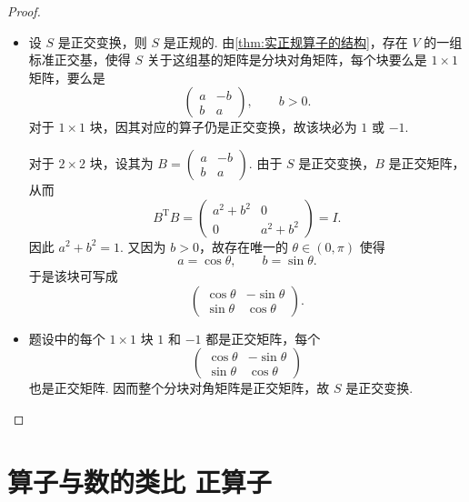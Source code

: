 \begin{proof}
    \begin{itemize}
        \item[(1) $ \Rightarrow $ (2)] 设 $ S $ 是正交变换，则 $ S $ 是正规的. 由\autoref{thm:实正规算子的结构}，存在 $ V $ 的一组标准正交基，使得 $ S $ 关于这组基的矩阵是分块对角矩阵，每个块要么是 $ 1 \times 1 $ 矩阵，要么是
        \[
            \begin{pmatrix}
                a & -b \\
                b & a
            \end{pmatrix},
            \qquad b > 0.
        \]
        对于 $ 1 \times 1 $ 块，因其对应的算子仍是正交变换，故该块必为 $ 1 $ 或 $ -1 $.

        对于 $ 2 \times 2 $ 块，设其为 $ B = \begin{pmatrix} a & -b \\ b & a \end{pmatrix} $. 由于 $ S $ 是正交变换，$ B $ 是正交矩阵，从而
        \[
            B^{\mathrm{T}} B = \begin{pmatrix}
                a^2 + b^2 & 0 \\
                0         & a^2 + b^2
            \end{pmatrix} = I.
        \]
        因此 $ a^2 + b^2 = 1 $. 又因为 $ b > 0 $，故存在唯一的 $ \theta \in (0, \pi) $ 使得
        \[
            a = \cos \theta, \qquad b = \sin \theta.
        \]
        于是该块可写成
        \[
            \begin{pmatrix}
                \cos \theta & -\sin \theta \\
                \sin \theta & \cos \theta
            \end{pmatrix}.
        \]

        \item[(2) $ \Rightarrow $ (1)] 题设中的每个 $ 1 \times 1 $ 块 $ 1 $ 和 $ -1 $ 都是正交矩阵，每个
        \[
            \begin{pmatrix}
                \cos \theta & -\sin \theta \\
                \sin \theta & \cos \theta
            \end{pmatrix}
        \]
        也是正交矩阵. 因而整个分块对角矩阵是正交矩阵，故 $ S $ 是正交变换.
    \end{itemize}
\end{proof}

\section{算子与数的类比 \quad 正算子}

